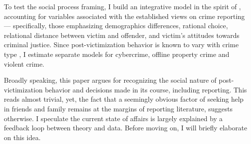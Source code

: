 \documentclass[]{interact}
\theoremstyle{plain}%
\theoremstyle{definition}
\theoremstyle{remark}
\newcommand\citep{\parencite}
\newcommand\citet{\textcite}
\begin{document}
	To test the social process framing, I build an integrative model in the spirit of \citet{xie2019crime}, accounting for variables associated with the established views on crime reporting --- specifically, those emphasizing demographics differences, rational choice, relational distance between victim and offender, and victim's attitudes towards criminal justice. Since post-victimization behavior is known to vary with crime type \citep{janoff1986aftermath, greenberg1992after}, %
	I estimate separate models for cybercrime, offline property crime and violent crime. 
	
	Broadly speaking, this paper argues for recognizing the social nature of post-victimization behavior and decisions made in its course, including reporting. This reads almost trivial, yet, the fact that a seemingly obvious factor of seeking help in friends and family remains at the margins of reporting literature, suggests otherwise. I speculate the current state of affairs is largely explained by a feedback loop between theory and data. Before moving on, I will briefly elaborate on this idea.
	
	
\end{document}
